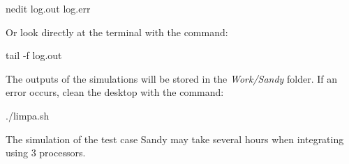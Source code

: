 \begin{bashcode}
nedit log.out log.err
\end{bashcode}
\bigskip

\noindent Or look directly at the terminal with the command:
\bigskip

\begin{bashcode}
tail -f log.out
\end{bashcode}
\bigskip

\noindent The outputs of the simulations will be stored in the \textit{Work/Sandy} folder. If an error occurs, clean the desktop with the command:
\bigskip

\begin{bashcode}
./limpa.sh
\end{bashcode}
\bigskip


\begin{tcolorbox}[enhanced,
  grow to left by=0cm,%
  grow to right by=0cm,%
  enlarge top by=0cm,%
  enlarge bottom by=0cm,%
  tcbox raise base,
  boxrule=1.0pt,
  left=18mm,
  colframe=red!50!black,coltext=red!25!black,colback=red!10!white,
  overlay={\begin{tcbclipinterior}\fill[red!75!blue!50!white] (frame.south west)
    rectangle node[text=white,font=\sffamily\bfseries\footnotesize,rotate=0] {WARNING} ([xshift=18mm]frame.north west);\end{tcbclipinterior}}]
    The simulation of the test case Sandy may take several hours when integrating using 3 processors.
\end{tcolorbox}
\bigskip
